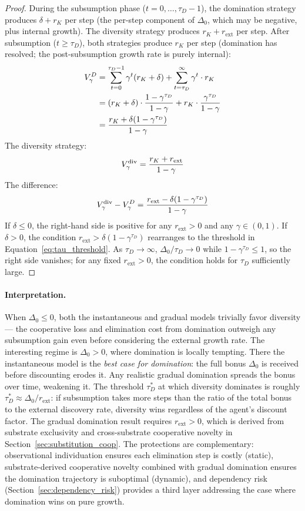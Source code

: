 \begin{proof}
During the subsumption phase ($t = 0, \ldots, \tau_D - 1$), the
domination strategy produces $\delta + r_K$ per step (the per-step
component of $\Delta_0$, which may be negative, plus internal growth).
The diversity strategy produces $r_K + r_{\mathrm{ext}}$ per step. After
subsumption ($t \geq \tau_D$), both strategies produce $r_K$ per step
(domination has resolved; the post-subsumption growth rate is purely
internal):
\begin{align*}
V_\gamma^D &= \sum_{t=0}^{\tau_D - 1} \gamma^t (r_K + \delta)
  + \sum_{t=\tau_D}^{\infty} \gamma^t \cdot r_K \\
  &= (r_K + \delta) \cdot \frac{1 - \gamma^{\tau_D}}{1 - \gamma}
  + r_K \cdot \frac{\gamma^{\tau_D}}{1 - \gamma} \\
  &= \frac{r_K + \delta(1 - \gamma^{\tau_D})}{1 - \gamma}
\end{align*}
The diversity strategy:
\[
V_\gamma^{\mathrm{div}} = \frac{r_K + r_{\mathrm{ext}}}{1 - \gamma}
\]
The difference:
\[
V_\gamma^{\mathrm{div}} - V_\gamma^D
  = \frac{r_{\mathrm{ext}} - \delta(1 - \gamma^{\tau_D})}{1 - \gamma}
\]
If $\delta \leq 0$, the right-hand side is positive for any
$r_{\mathrm{ext}} > 0$ and any $\gamma \in (0, 1)$. If $\delta > 0$, the
condition $r_{\mathrm{ext}} > \delta(1 - \gamma^{\tau_D})$ rearranges to
the threshold in Equation~\eqref{eq:tau_threshold}. As $\tau_D \to
\infty$, $\Delta_0 / \tau_D \to 0$ while $1 - \gamma^{\tau_D} \leq 1$,
so the right side vanishes; for any fixed $r_{\mathrm{ext}} > 0$, the
condition holds for $\tau_D$ sufficiently large.
\end{proof}

\paragraph{Interpretation.} When $\Delta_0 \leq 0$, both the instantaneous
and gradual models trivially favor diversity --- the cooperative loss and
elimination cost from domination outweigh any subsumption gain even before
considering the external growth rate. The interesting regime is $\Delta_0
> 0$, where domination is locally tempting. There the instantaneous model
is the \emph{best case for domination}: the full bonus $\Delta_0$ is
received before discounting erodes it. Any realistic gradual domination
spreads the bonus over time, weakening it. The threshold $\tau_D^*$ at
which diversity dominates is roughly $\tau_D^* \approx \Delta_0 /
r_{\mathrm{ext}}$: if subsumption takes more steps than the ratio of the
total bonus to the external discovery rate, diversity wins regardless of
the agent's discount factor.
The gradual domination result requires $r_{\mathrm{ext}} > 0$, which is
derived from substrate exclusivity and cross-substrate cooperative novelty
in Section~\ref{sec:substitution_coop}. The protections are complementary:
observational individuation ensures each elimination step is costly
(static), substrate-derived cooperative novelty combined with gradual
domination ensures the domination trajectory is suboptimal (dynamic), and
dependency risk (Section~\ref{sec:dependency_risk}) provides a third layer
addressing the case where domination wins on pure growth.

